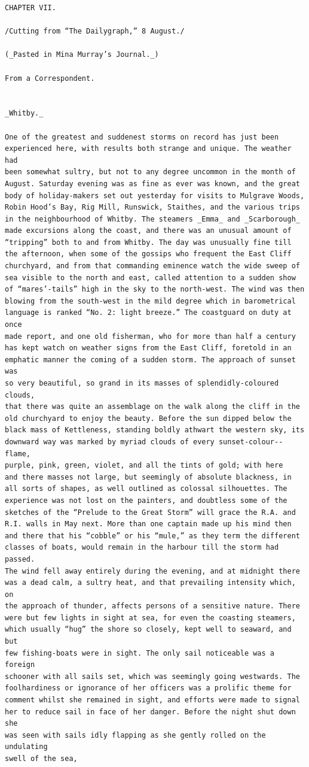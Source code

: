 \documentclass{article}
\begin{document}
\begin{verbatim}
CHAPTER VII.

/Cutting from “The Dailygraph,” 8 August./

(_Pasted in Mina Murray’s Journal._)

From a Correspondent.


_Whitby._

One of the greatest and suddenest storms on record has just been
experienced here, with results both strange and unique. The weather had
been somewhat sultry, but not to any degree uncommon in the month of
August. Saturday evening was as fine as ever was known, and the great
body of holiday-makers set out yesterday for visits to Mulgrave Woods,
Robin Hood’s Bay, Rig Mill, Runswick, Staithes, and the various trips
in the neighbourhood of Whitby. The steamers _Emma_ and _Scarborough_
made excursions along the coast, and there was an unusual amount of
“tripping” both to and from Whitby. The day was unusually fine till
the afternoon, when some of the gossips who frequent the East Cliff
churchyard, and from that commanding eminence watch the wide sweep of
sea visible to the north and east, called attention to a sudden show
of “mares’-tails” high in the sky to the north-west. The wind was then
blowing from the south-west in the mild degree which in barometrical
language is ranked “No. 2: light breeze.” The coastguard on duty at once
made report, and one old fisherman, who for more than half a century
has kept watch on weather signs from the East Cliff, foretold in an
emphatic manner the coming of a sudden storm. The approach of sunset was
so very beautiful, so grand in its masses of splendidly-coloured clouds,
that there was quite an assemblage on the walk along the cliff in the
old churchyard to enjoy the beauty. Before the sun dipped below the
black mass of Kettleness, standing boldly athwart the western sky, its
downward way was marked by myriad clouds of every sunset-colour--flame,
purple, pink, green, violet, and all the tints of gold; with here
and there masses not large, but seemingly of absolute blackness, in
all sorts of shapes, as well outlined as colossal silhouettes. The
experience was not lost on the painters, and doubtless some of the
sketches of the “Prelude to the Great Storm” will grace the R.A. and
R.I. walls in May next. More than one captain made up his mind then
and there that his “cobble” or his “mule,” as they term the different
classes of boats, would remain in the harbour till the storm had passed.
The wind fell away entirely during the evening, and at midnight there
was a dead calm, a sultry heat, and that prevailing intensity which, on
the approach of thunder, affects persons of a sensitive nature. There
were but few lights in sight at sea, for even the coasting steamers,
which usually “hug” the shore so closely, kept well to seaward, and but
few fishing-boats were in sight. The only sail noticeable was a foreign
schooner with all sails set, which was seemingly going westwards. The
foolhardiness or ignorance of her officers was a prolific theme for
comment whilst she remained in sight, and efforts were made to signal
her to reduce sail in face of her danger. Before the night shut down she
was seen with sails idly flapping as she gently rolled on the undulating
swell of the sea,


\end{verbatim}
\end{document}
